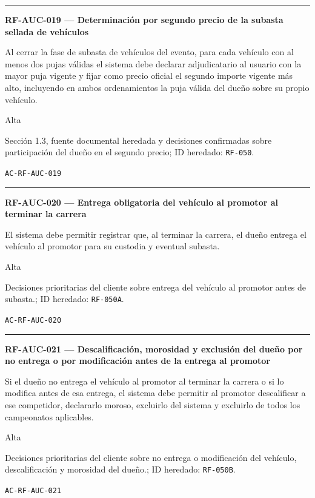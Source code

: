 \documentclass[10pt,letterpaper]{article}
\begin{document}
\vspace{0.25em}\hrule\vspace{0.65em}
\noindent\textbf{RF-AUC-019 --- Determinación por segundo precio de la subasta sellada de vehículos}\par
\begin{description}[style=nextline,leftmargin=3.15cm,labelwidth=2.8cm,font=\normalfont\bfseries]
\item[Obligación] Al cerrar la fase de subasta de vehículos del evento, para cada vehículo con al menos dos pujas válidas el sistema debe declarar adjudicatario al usuario con la mayor puja vigente y fijar como precio oficial el segundo importe vigente más alto, incluyendo en ambos ordenamientos la puja válida del dueño sobre su propio vehículo.
\item[Prioridad] Alta
\item[Procedencia] Sección 1.3, fuente documental heredada y decisiones confirmadas sobre participación del dueño en el segundo precio; ID heredado: \texttt{RF-050}.
\item[Verificación] \texttt{AC-RF-AUC-019}
\end{description}
\vspace{0.25em}\hrule\vspace{0.65em}
\noindent\textbf{RF-AUC-020 --- Entrega obligatoria del vehículo al promotor al terminar la carrera}\par
\begin{description}[style=nextline,leftmargin=3.15cm,labelwidth=2.8cm,font=\normalfont\bfseries]
\item[Obligación] El sistema debe permitir registrar que, al terminar la carrera, el dueño entrega el vehículo al promotor para su custodia y eventual subasta.
\item[Prioridad] Alta
\item[Procedencia] Decisiones prioritarias del cliente sobre entrega del vehículo al promotor antes de subasta.; ID heredado: \texttt{RF-050A}.
\item[Verificación] \texttt{AC-RF-AUC-020}
\end{description}
\vspace{0.25em}\hrule\vspace{0.65em}
\noindent\textbf{RF-AUC-021 --- Descalificación, morosidad y exclusión del dueño por no entrega o por modificación antes de la entrega al promotor}\par
\begin{description}[style=nextline,leftmargin=3.15cm,labelwidth=2.8cm,font=\normalfont\bfseries]
\item[Obligación] Si el dueño no entrega el vehículo al promotor al terminar la carrera o si lo modifica antes de esa entrega, el sistema debe permitir al promotor descalificar a ese competidor, declararlo moroso, excluirlo del sistema y excluirlo de todos los campeonatos aplicables.
\item[Prioridad] Alta
\item[Procedencia] Decisiones prioritarias del cliente sobre no entrega o modificación del vehículo, descalificación y morosidad del dueño.; ID heredado: \texttt{RF-050B}.
\item[Verificación] \texttt{AC-RF-AUC-021}
\end{description}
\end{document}
